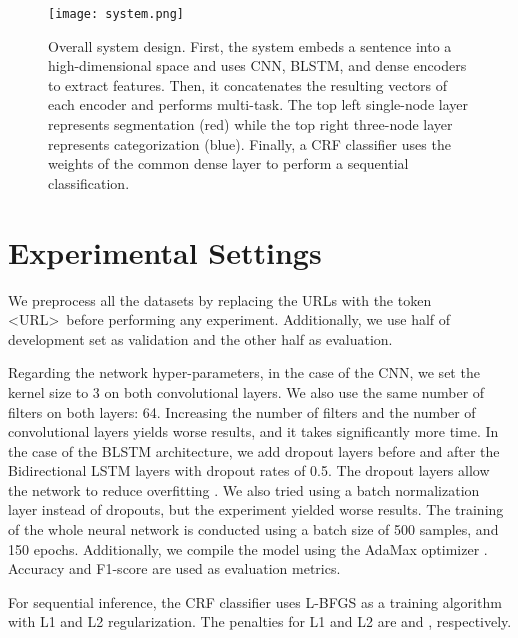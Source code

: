 \documentclass[11pt,letterpaper]{article}
\begin{document}
\begin{figure}
\texttt{[image: system.png]}
\caption{ \small Overall system design. First, the system embeds a sentence into a high-dimensional space and uses CNN, BLSTM, and dense encoders to extract features. Then, it concatenates the resulting vectors of each encoder and performs multi-task. The top left single-node layer represents segmentation (red) while the top right three-node layer represents categorization (blue). Finally, a CRF classifier uses the weights of the common dense layer to perform a sequential classification. }
\label{fig:system_overview}
\end{figure}

\section{Experimental Settings} 

We preprocess all the datasets by replacing the URLs with the token \textless URL\textgreater~before performing any experiment. Additionally, we use half of development set as validation and the other half as evaluation.

Regarding the network hyper-parameters, in the case of the CNN, we set the kernel size to 3 on both convolutional layers. We also use the same number of filters on both layers: 64. Increasing the number of filters and the number of convolutional layers yields worse results, and it takes significantly more time. In the case of the BLSTM architecture, we add dropout layers before and after the Bidirectional LSTM layers with dropout rates of 0.5. The dropout layers allow the network to reduce overfitting \cite{Srivastava:2014:DSW:2627435.2670313}. We also tried using a batch normalization layer instead of dropouts, but the experiment yielded worse results. The training of the whole neural network is conducted using a batch size of 500 samples, and 150 epochs. Additionally, we compile the model using the AdaMax optimizer \cite{DBLP:journals/corr/KingmaB14}. Accuracy and F1-score are used as evaluation metrics.

For sequential inference, the CRF classifier uses L-BFGS as a training algorithm with L1 and L2 regularization. The penalties for L1 and L2 are  and , respectively.
\end{document}
